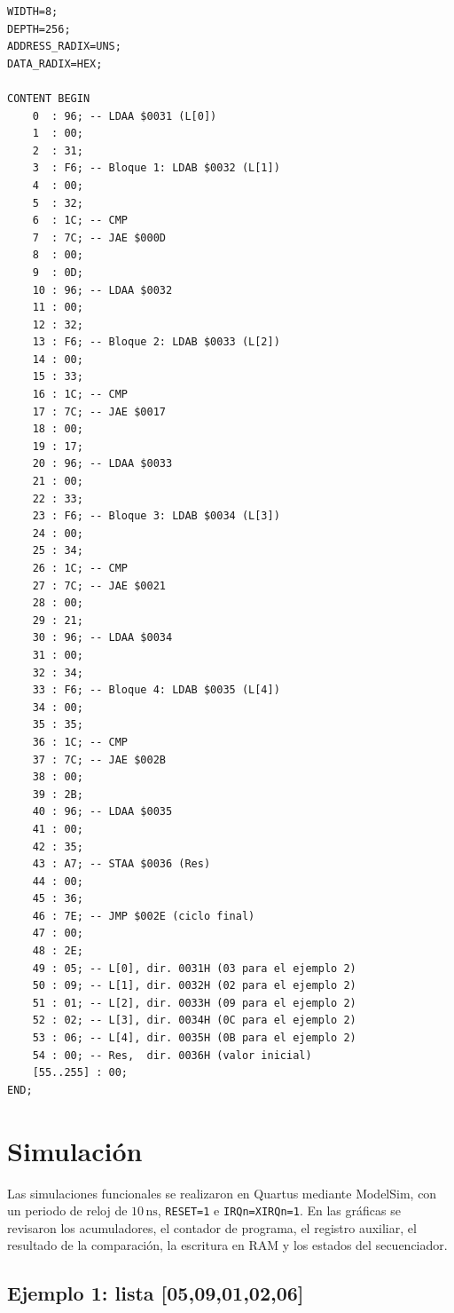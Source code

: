 \documentclass[letterpaper,12pt]{article}
\begin{document}
\begin{lstlisting}[style=mif,caption={Contenido completo de \texttt{mem\_content.mif} para la búsqueda del número mayor.},label={lst:datos1}]
WIDTH=8;
DEPTH=256;
ADDRESS_RADIX=UNS;
DATA_RADIX=HEX;

CONTENT BEGIN
    0  : 96; -- LDAA $0031 (L[0])
    1  : 00;
    2  : 31;
    3  : F6; -- Bloque 1: LDAB $0032 (L[1])
    4  : 00;
    5  : 32;
    6  : 1C; -- CMP
    7  : 7C; -- JAE $000D
    8  : 00;
    9  : 0D;
    10 : 96; -- LDAA $0032
    11 : 00;
    12 : 32;
    13 : F6; -- Bloque 2: LDAB $0033 (L[2])
    14 : 00;
    15 : 33;
    16 : 1C; -- CMP
    17 : 7C; -- JAE $0017
    18 : 00;
    19 : 17;
    20 : 96; -- LDAA $0033
    21 : 00;
    22 : 33;
    23 : F6; -- Bloque 3: LDAB $0034 (L[3])
    24 : 00;
    25 : 34;
    26 : 1C; -- CMP
    27 : 7C; -- JAE $0021
    28 : 00;
    29 : 21;
    30 : 96; -- LDAA $0034
    31 : 00;
    32 : 34;
    33 : F6; -- Bloque 4: LDAB $0035 (L[4])
    34 : 00;
    35 : 35;
    36 : 1C; -- CMP
    37 : 7C; -- JAE $002B
    38 : 00;
    39 : 2B;
    40 : 96; -- LDAA $0035
    41 : 00;
    42 : 35;
    43 : A7; -- STAA $0036 (Res)
    44 : 00;
    45 : 36;
    46 : 7E; -- JMP $002E (ciclo final)
    47 : 00;
    48 : 2E;
    49 : 05; -- L[0], dir. 0031H (03 para el ejemplo 2)
    50 : 09; -- L[1], dir. 0032H (02 para el ejemplo 2)
    51 : 01; -- L[2], dir. 0033H (09 para el ejemplo 2)
    52 : 02; -- L[3], dir. 0034H (0C para el ejemplo 2)
    53 : 06; -- L[4], dir. 0035H (0B para el ejemplo 2)
    54 : 00; -- Res,  dir. 0036H (valor inicial)
    [55..255] : 00;
END;
\end{lstlisting}

\section{Simulación}

Las simulaciones funcionales se realizaron en Quartus mediante ModelSim, con un periodo de reloj de $10\,\text{ns}$, \texttt{RESET=1} e \texttt{IRQn=XIRQn=1}. En las gráficas se revisaron los acumuladores, el contador de programa, el registro auxiliar, el resultado de la comparación, la escritura en RAM y los estados del secuenciador.

\subsection{Ejemplo 1: lista [05,09,01,02,06]}
\end{document}
